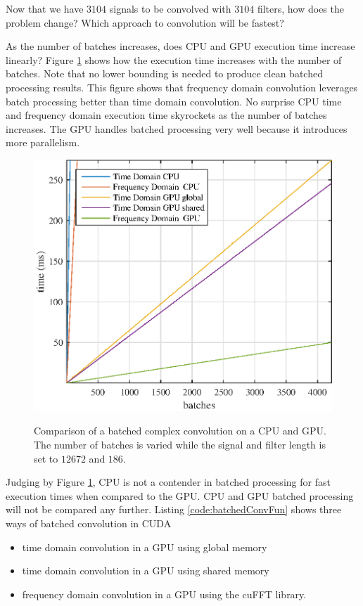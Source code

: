 Now that we have $3104$ signals to be convolved with $3104$ filters, how does the problem change?
Which approach to convolution will be fastest?

As the number of batches increases, does CPU and GPU execution time increase linearly?
Figure \ref{fig:CPUvsGPU_varyBatches_186taps_12672signal} shows how the execution time increases with the number of batches.
Note that no lower bounding is needed to produce clean batched processing results.
This figure shows that frequency domain convolution leverages batch processing better than time domain convolution.
No surprise CPU time and frequency domain execution time skyrockets as the number of batches increases.
The GPU handles batched processing very well because it introduces more parallelism.
\begin{figure}
	\caption{Comparison of a batched complex convolution on a CPU and GPU. The number of batches is varied while the signal and filter length is set to $12672$ and $186$.}
	\centering\includegraphics[width=5in]{figures/gpu_intro/CPUvsGPU_varyBatches_186taps_12672signal.eps}
	\label{fig:CPUvsGPU_varyBatches_186taps_12672signal}
\end{figure}

Judging by Figure \ref{fig:CPUvsGPU_varyBatches_186taps_12672signal}, CPU is not a contender in batched processing for fast execution times when compared to the GPU.
CPU and GPU batched processing will not be compared any further.
Listing \ref{code:batchedConvFun} shows three ways of batched convolution in CUDA
\begin{itemize}
  \item time domain convolution in a GPU using global memory
  \item time domain convolution in a GPU using shared memory
  \item frequency domain convolution in a GPU using the cuFFT library.
\end{itemize}

